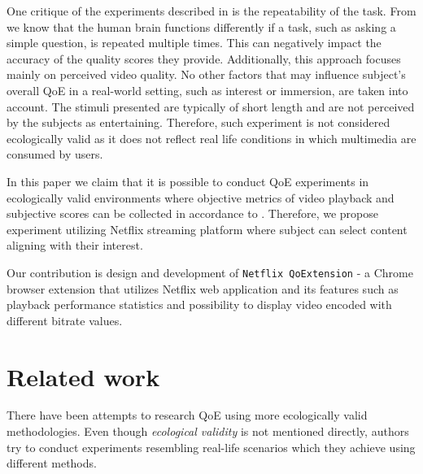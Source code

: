 \documentclass[conference]{IEEEtran}
\begin{document}
    One critique of the experiments described in \cite{BT.500-14, ITU-T-P.913} is the repeatability of the task. From \cite{brain} we know that the human brain functions differently if a task, such as asking a simple question, is repeated multiple times. This can negatively impact the accuracy of the quality scores they provide. 
    Additionally, this approach focuses mainly on perceived video quality. No other factors that may influence subject's overall QoE in a real-world setting, such as interest or immersion, are taken into account. The stimuli presented are typically of short length and are not perceived by the subjects as entertaining. Therefore, such experiment is not considered ecologically valid as it does not reflect real life conditions in which multimedia are consumed by users.

    In this paper we claim that it is possible to conduct QoE experiments in ecologically valid environments where objective metrics of video playback and subjective scores can be collected in accordance to \cite{BT.500-14}. 
    Therefore, we propose experiment utilizing Netflix streaming platform where subject can select content aligning with their interest. 

    Our contribution is design and development of \verb|Netflix QoExtension| - a Chrome browser extension that utilizes Netflix web application and its features such as playback performance statistics and possibility to display video encoded with different bitrate values. 

\section{Related work}
\label{sec:related_work}
    There have been attempts to research QoE using more ecologically valid methodologies. Even though \textit{ecological validity} \cite{kihlstrom2021ecological} is not mentioned directly, authors try to conduct experiments resembling real-life scenarios which they achieve using different methods.
    
\end{document}
